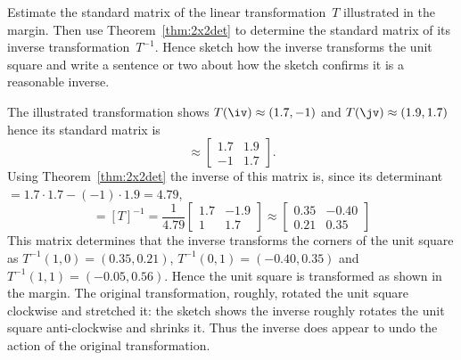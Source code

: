 \begin{example} \label{eg:}
Estimate the standard matrix of the linear transformation~\(T\) illustrated in the margin.  
%
Then use Theorem~\ref{thm:2x2det} to determine the standard matrix of its inverse transformation~\(T^{-1}\).
Hence sketch how the inverse transforms the unit square and write a sentence or two about how the sketch confirms it is a reasonable inverse. 
\begin{solution} 
The illustrated transformation shows \(T(\iv)\approx(1.7,-1)\) and \(T(\jv)\approx(1.9,1.7)\) hence its standard matrix is
\begin{equation*}
[T]\approx\begin{bmatrix} 1.7&1.9\\-1&1.7 \end{bmatrix}.
\end{equation*}
Using Theorem~\ref{thm:2x2det} the inverse of this matrix is, since its determinant\({}=1.7\cdot1.7-(-1)\cdot1.9=4.79\),
\begin{equation*}
[T^{-1}]=[T]^{-1}
=\frac1{4.79} \begin{bmatrix} 1.7&-1.9\\1&1.7 \end{bmatrix}
\approx\begin{bmatrix} 0.35&-0.40\\0.21&0.35 \end{bmatrix}
\end{equation*}
This matrix determines that the inverse transforms the corners of the unit square as \(T^{-1}(1,0)=(0.35,0.21)\), \(T^{-1}(0,1)=(-0.40,0.35)\) and \(T^{-1}(1,1)=(-0.05,0.56)\).
%
Hence the unit square is transformed as shown in the margin.
The original transformation, roughly, rotated the unit square clockwise and stretched it: the sketch shows the inverse roughly rotates the unit square anti-clockwise and shrinks it.  
Thus the inverse does appear to undo the action of the original transformation.
\end{solution}
\end{example}




